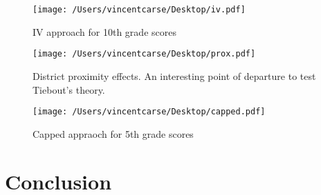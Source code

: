 \documentclass[11pt]{article}
\begin{document}
\begin{figure}
    \label{image-myimage}
    \texttt{[image: /Users/vincentcarse/Desktop/iv.pdf]}
    \caption{IV approach for 10th grade scores}
\end{figure}

\begin{figure}
    \label{image-myimage}
    \texttt{[image: /Users/vincentcarse/Desktop/prox.pdf]}
    \caption{District proximity effects. An interesting point of departure to test Tiebout's theory.}
\end{figure}

\begin{figure}
    \label{image-myimage}
    \texttt{[image: /Users/vincentcarse/Desktop/capped.pdf]}
    \caption{Capped appraoch for 5th grade scores}
\end{figure}


\FloatBarrier

\section{Conclusion}
\end{document}
